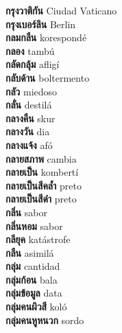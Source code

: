 \textbf{ กรุงวาติกัน  } Ciudad Vaticano \\
\textbf{ กรุงเบอร์ลิน  } Berlin \\
\textbf{ กลมกลืน  } korespondé \\
\textbf{ กลอง  } tambú \\
\textbf{ กลัดกลุ้ม  } afligí \\
\textbf{ กลับด้าน  } boltermento \\
\textbf{ กลัว  } miedoso \\
\textbf{ กลั่น  } destilá \\
\textbf{ กลางคืน  } skur \\
\textbf{ กลางวัน  } dia \\
\textbf{ กลางแจ้ง  } afó \\
\textbf{ กลายสภาพ  } cambia \\
\textbf{ กลายเป็น  } kombertí \\
\textbf{ กลายเป็นสีคล้ำ  } preto \\
\textbf{ กลายเป็นสีดำ  } preto \\
\textbf{ กลิ่น  } sabor \\
\textbf{ กลิ่นหอม  } sabor \\
\textbf{ กลียุค  } katástrofe \\
\textbf{ กลืน  } asimilá \\
\textbf{ กลุ่ม  } cantidad \\
\textbf{ กลุ่มก้อน  } bala \\
\textbf{ กลุ่มข้อมูล  } data \\
\textbf{ กลุ่มคนผิวสี  } koló \\
\textbf{ กลุ่มคนหูหนวก  } sordo \\
